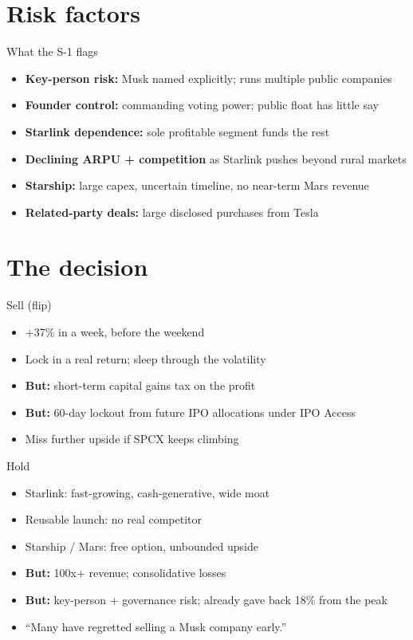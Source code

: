 \documentclass[aspectratio=169,11pt]{beamer}
\begin{document}
\section{Risk factors}

\begin{frame}{What the S-1 flags}
  \begin{itemize}
    \item \textbf{Key-person risk:} Musk named explicitly; runs multiple public companies
    \item \textbf{Founder control:} commanding voting power; public float has little say
    \item \textbf{Starlink dependence:} sole profitable segment funds the rest
    \item \textbf{Declining ARPU + competition} as Starlink pushes beyond rural markets
    \item \textbf{Starship:} large capex, uncertain timeline, no near-term Mars revenue
    \item \textbf{Related-party deals:} large disclosed purchases from Tesla
  \end{itemize}
\end{frame}

\section{The decision}

\begin{frame}{Sell (flip)}
  \begin{itemize}
    \item +37\% in a week, before the weekend
    \item Lock in a real return; sleep through the volatility
    \item \textbf{But:} short-term capital gains tax on the profit
    \item \textbf{But:} 60-day lockout from future IPO allocations under IPO Access
    \item Miss further upside if SPCX keeps climbing
  \end{itemize}
\end{frame}

\begin{frame}{Hold}
  \begin{itemize}
    \item Starlink: fast-growing, cash-generative, wide moat
    \item Reusable launch: no real competitor
    \item Starship / Mars: free option, unbounded upside
    \item \textbf{But:} 100x+ revenue; consolidative losses
    \item \textbf{But:} key-person + governance risk; already gave back 18\% from the peak
    \item ``Many have regretted selling a Musk company early.''
  \end{itemize}
\end{frame}
\end{document}
